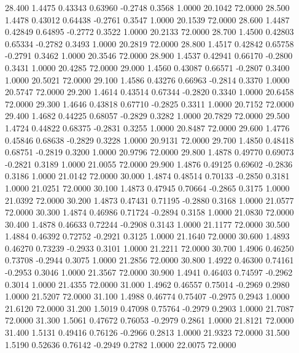   28.400   1.4475   0.43343   0.63960  -0.2748   0.3568   1.0000  20.1042  72.0000
  28.500   1.4478   0.43012   0.64438  -0.2761   0.3547   1.0000  20.1539  72.0000
  28.600   1.4487   0.42849   0.64895  -0.2772   0.3522   1.0000  20.2133  72.0000
  28.700   1.4500   0.42803   0.65334  -0.2782   0.3493   1.0000  20.2819  72.0000
  28.800   1.4517   0.42842   0.65758  -0.2791   0.3462   1.0000  20.3546  72.0000
  28.900   1.4537   0.42941   0.66170  -0.2800   0.3431   1.0000  20.4285  72.0000
  29.000   1.4560   0.43087   0.66571  -0.2807   0.3400   1.0000  20.5021  72.0000
  29.100   1.4586   0.43276   0.66963  -0.2814   0.3370   1.0000  20.5747  72.0000
  29.200   1.4614   0.43514   0.67344  -0.2820   0.3340   1.0000  20.6458  72.0000
  29.300   1.4646   0.43818   0.67710  -0.2825   0.3311   1.0000  20.7152  72.0000
  29.400   1.4682   0.44225   0.68057  -0.2829   0.3282   1.0000  20.7829  72.0000
  29.500   1.4724   0.44822   0.68375  -0.2831   0.3255   1.0000  20.8487  72.0000
  29.600   1.4776   0.45846   0.68638  -0.2829   0.3228   1.0000  20.9131  72.0000
  29.700   1.4850   0.48418   0.68751  -0.2819   0.3200   1.0000  20.9796  72.0000
  29.800   1.4878   0.49770   0.69073  -0.2821   0.3189   1.0000  21.0055  72.0000
  29.900   1.4876   0.49125   0.69602  -0.2836   0.3186   1.0000  21.0142  72.0000
  30.000   1.4874   0.48514   0.70133  -0.2850   0.3181   1.0000  21.0251  72.0000
  30.100   1.4873   0.47945   0.70664  -0.2865   0.3175   1.0000  21.0392  72.0000
  30.200   1.4873   0.47431   0.71195  -0.2880   0.3168   1.0000  21.0577  72.0000
  30.300   1.4874   0.46986   0.71724  -0.2894   0.3158   1.0000  21.0830  72.0000
  30.400   1.4878   0.46633   0.72244  -0.2908   0.3143   1.0000  21.1177  72.0000
  30.500   1.4884   0.46392   0.72752  -0.2921   0.3125   1.0000  21.1640  72.0000
  30.600   1.4893   0.46270   0.73239  -0.2933   0.3101   1.0000  21.2211  72.0000
  30.700   1.4906   0.46250   0.73708  -0.2944   0.3075   1.0000  21.2856  72.0000
  30.800   1.4922   0.46300   0.74161  -0.2953   0.3046   1.0000  21.3567  72.0000
  30.900   1.4941   0.46403   0.74597  -0.2962   0.3014   1.0000  21.4355  72.0000
  31.000   1.4962   0.46557   0.75014  -0.2969   0.2980   1.0000  21.5207  72.0000
  31.100   1.4988   0.46774   0.75407  -0.2975   0.2943   1.0000  21.6120  72.0000
  31.200   1.5019   0.47098   0.75764  -0.2979   0.2903   1.0000  21.7087  72.0000
  31.300   1.5061   0.47672   0.76053  -0.2979   0.2861   1.0000  21.8121  72.0000
  31.400   1.5131   0.49416   0.76126  -0.2966   0.2813   1.0000  21.9323  72.0000
  31.500   1.5190   0.52636   0.76142  -0.2949   0.2782   1.0000  22.0075  72.0000
